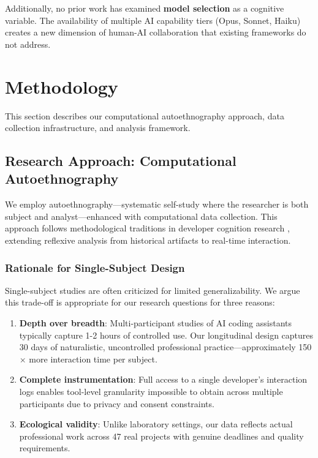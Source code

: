 \documentclass{ntlabs-preprint}
\begin{document}
Additionally, no prior work has examined \textbf{model selection} as a cognitive variable. The availability of multiple AI capability tiers (Opus, Sonnet, Haiku) creates a new dimension of human-AI collaboration that existing frameworks do not address.

\section{Methodology}

This section describes our computational autoethnography approach, data collection infrastructure, and analysis framework.

\subsection{Research Approach: Computational Autoethnography}

We employ autoethnography---systematic self-study where the researcher is both subject and analyst---enhanced with computational data collection. This approach follows methodological traditions in developer cognition research \citep{silva2025dmmf}, extending reflexive analysis from historical artifacts to real-time interaction.

\subsubsection{Rationale for Single-Subject Design}

Single-subject studies are often criticized for limited generalizability. We argue this trade-off is appropriate for our research questions for three reasons:

\begin{enumerate}
    \item \textbf{Depth over breadth}: Multi-participant studies of AI coding assistants typically capture 1-2 hours of controlled use. Our longitudinal design captures 30 days of naturalistic, uncontrolled professional practice---approximately 150$\times$ more interaction time per subject.

    \item \textbf{Complete instrumentation}: Full access to a single developer's interaction logs enables tool-level granularity impossible to obtain across multiple participants due to privacy and consent constraints.

    \item \textbf{Ecological validity}: Unlike laboratory settings, our data reflects actual professional work across 47 real projects with genuine deadlines and quality requirements.
\end{enumerate}
\end{document}
